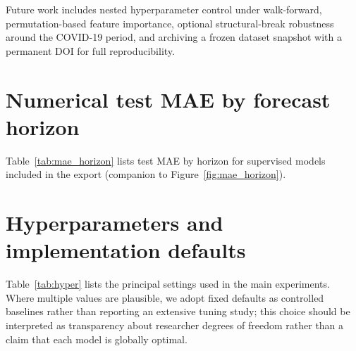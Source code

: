 \documentclass[11pt,a4paper]{article}
\begin{document}
Future work includes nested hyperparameter control under walk-forward, permutation-based feature importance, optional structural-break robustness around the COVID-19 period, and archiving a frozen dataset snapshot with a permanent DOI for full reproducibility.

\appendix

\section{Numerical test MAE by forecast horizon}
\label{app:horizon}

Table~\ref{tab:mae_horizon} lists test MAE by horizon for supervised models included in the export (companion to Figure~\ref{fig:mae_horizon}).



\section{Hyperparameters and implementation defaults}
\label{app:hyper}

Table~\ref{tab:hyper} lists the principal settings used in the main experiments. Where multiple values are plausible, we adopt fixed defaults as controlled baselines rather than reporting an extensive tuning study; this choice should be interpreted as transparency about researcher degrees of freedom rather than a claim that each model is globally optimal.
\end{document}
